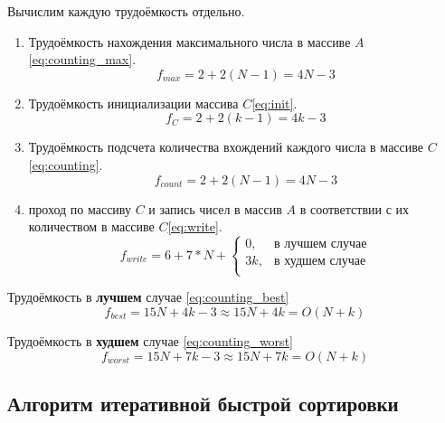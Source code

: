 Вычислим каждую трудоёмкость отдельно.

\begin{enumerate}
    \item Трудоёмкость нахождения максимального числа в массиве $A$\eqref{eq:counting_max}.
    \begin{equation}
        \label{eq:counting_max}
        f_{max} = 2 + 2(N - 1) = 4N - 3
    \end{equation}
    \item Трудоёмкость инициализации массива $C$\eqref{eq:init}.
    \begin{equation}
        \label{eq:init}
        f_{C} = 2 + 2(k - 1) = 4k - 3
    \end{equation}
    \item Трудоёмкость подсчета количества вхождений каждого числа в массиве $C$\eqref{eq:counting}.
    \begin{equation}
        \label{eq:counting}
        f_{count} = 2 + 2(N - 1) = 4N - 3
    \end{equation}
    \item проход по массиву $C$ и запись чисел в массив $A$ в соответствии с их количеством в массиве $C$\eqref{eq:write}.
    \begin{equation}
        \label{eq:write}
        f_{write} = 6 + 7 * N + \begin{cases}
                            0, & \text{в лучшем случае}\\
                            3k, & \text{в худшем случае}\\
        \end{cases}
    \end{equation}
\end{enumerate}

Трудоёмкость в \textbf{лучшем} случае \eqref{eq:counting_best}
\begin{equation}
    \label{eq:counting_best}
    f_{best} = 15N + 4k - 3 \approx 15N + 4k = O(N + k)
\end{equation}

Трудоёмкость в \textbf{худшем} случае \eqref{eq:counting_worst}
\begin{equation}
    \label{eq:counting_worst}
    f_{worst} = 15N + 7k - 3 \approx 15N + 7k = O(N + k)
\end{equation}

\subsection{Алгоритм итеративной быстрой сортировки}

